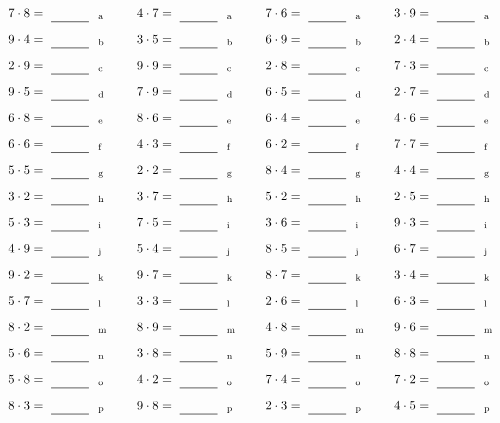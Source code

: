 \documentclass
[
  draft    = true,
  fontsize = 11pt,
  parskip  = half-
]
{scrartcl}
\begin{document}
\par\vfill\par
\begin{align*}
    \pline{7\cdot8}&=\rline{a}
  & \pline{4\cdot7}&=\rline{a}
  & \pline{7\cdot6}&=\rline{a}
  & \pline{3\cdot9}&=\rline{a} \\[1ex]
    \pline{9\cdot4}&=\rline{b}
  & \pline{3\cdot5}&=\rline{b}
  & \pline{6\cdot9}&=\rline{b}
  & \pline{2\cdot4}&=\rline{b} \\[1ex]
    \pline{2\cdot9}&=\rline{c}
  & \pline{9\cdot9}&=\rline{c}
  & \pline{2\cdot8}&=\rline{c}
  & \pline{7\cdot3}&=\rline{c} \\[1ex]
    \pline{9\cdot5}&=\rline{d}
  & \pline{7\cdot9}&=\rline{d}
  & \pline{6\cdot5}&=\rline{d}
  & \pline{2\cdot7}&=\rline{d} \\[1ex]
    \pline{6\cdot8}&=\rline{e}
  & \pline{8\cdot6}&=\rline{e}
  & \pline{6\cdot4}&=\rline{e}
  & \pline{4\cdot6}&=\rline{e} \\[1ex]
    \pline{6\cdot6}&=\rline{f}
  & \pline{4\cdot3}&=\rline{f}
  & \pline{6\cdot2}&=\rline{f}
  & \pline{7\cdot7}&=\rline{f} \\[1ex]
    \pline{5\cdot5}&=\rline{g}
  & \pline{2\cdot2}&=\rline{g}
  & \pline{8\cdot4}&=\rline{g}
  & \pline{4\cdot4}&=\rline{g} \\[1ex]
    \pline{3\cdot2}&=\rline{h}
  & \pline{3\cdot7}&=\rline{h}
  & \pline{5\cdot2}&=\rline{h}
  & \pline{2\cdot5}&=\rline{h} \\[1ex]
    \pline{5\cdot3}&=\rline{i}
  & \pline{7\cdot5}&=\rline{i}
  & \pline{3\cdot6}&=\rline{i}
  & \pline{9\cdot3}&=\rline{i} \\[1ex]
    \pline{4\cdot9}&=\rline{j}
  & \pline{5\cdot4}&=\rline{j}
  & \pline{8\cdot5}&=\rline{j}
  & \pline{6\cdot7}&=\rline{j} \\[1ex]
    \pline{9\cdot2}&=\rline{k}
  & \pline{9\cdot7}&=\rline{k}
  & \pline{8\cdot7}&=\rline{k}
  & \pline{3\cdot4}&=\rline{k} \\[1ex]
    \pline{5\cdot7}&=\rline{l}
  & \pline{3\cdot3}&=\rline{l}
  & \pline{2\cdot6}&=\rline{l}
  & \pline{6\cdot3}&=\rline{l} \\[1ex]
    \pline{8\cdot2}&=\rline{m}
  & \pline{8\cdot9}&=\rline{m}
  & \pline{4\cdot8}&=\rline{m}
  & \pline{9\cdot6}&=\rline{m} \\[1ex]
    \pline{5\cdot6}&=\rline{n}
  & \pline{3\cdot8}&=\rline{n}
  & \pline{5\cdot9}&=\rline{n}
  & \pline{8\cdot8}&=\rline{n} \\[1ex]
    \pline{5\cdot8}&=\rline{o}
  & \pline{4\cdot2}&=\rline{o}
  & \pline{7\cdot4}&=\rline{o}
  & \pline{7\cdot2}&=\rline{o} \\[1ex]
    \pline{8\cdot3}&=\rline{p}
  & \pline{9\cdot8}&=\rline{p}
  & \pline{2\cdot3}&=\rline{p}
  & \pline{4\cdot5}&=\rline{p}
\end{align*}
\end{document}
